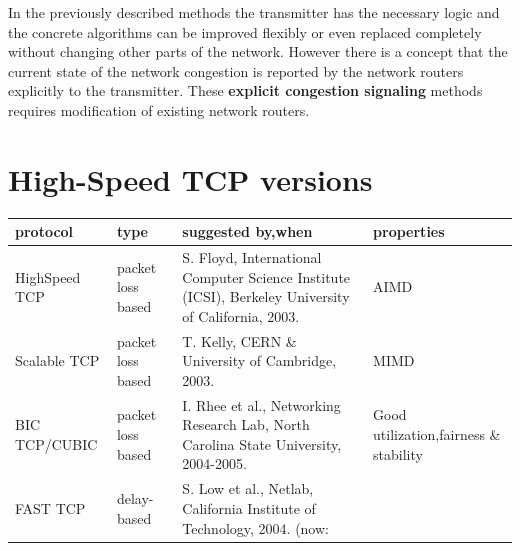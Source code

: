 \documentclass[a4paper]{article}
\begin{document}
In the previously described methods the transmitter has the necessary logic  and the concrete algorithms can be
improved flexibly or even replaced completely without changing other parts of the network. However there is a concept
that the current state of the network congestion is reported by the network routers explicitly to the transmitter.
These \textbf{explicit congestion signaling} methods requires modification of existing network routers.

\section{High-Speed TCP versions}
\begin{table}
    \begin{tabular}{|p{}|p{}|p{}|p{}|}\hline
        \cellcolor{blue!25}protocol                                                   & \cellcolor{blue!25}type                & \cellcolor{blue!25}suggested by,when                                   &
        \cellcolor{blue!25}properties                                                                                                                                                                                         \\\hline
        \cellcolor{blue!25}HighSpeed TCP                                              & packet loss based                      & S. Floyd, International Computer Science Institute (ICSI),
        Berkeley University of California, 2003.                                      & AIMD                                                                                                                                  \\\hline
        \cellcolor{blue!25}Scalable TCP                                               & packet loss based                      & T. Kelly, CERN \& University of Cambridge, 2003.                       & MIMD                \\\hline
        \cellcolor{blue!25}BIC TCP/CUBIC                                              & packet loss based                      & I. Rhee et al., Networking Research Lab, North Carolina State
        University, 2004-2005.                                                        & Good utilization,fairness \& stability                                                                                                \\\hline
        \cellcolor{blue!25}FAST TCP                                                   & delay-based                            & S. Low et al., Netlab, California Institute of Technology, 2004. (now:

\end{tabular}
\end{table}
\end{document}
